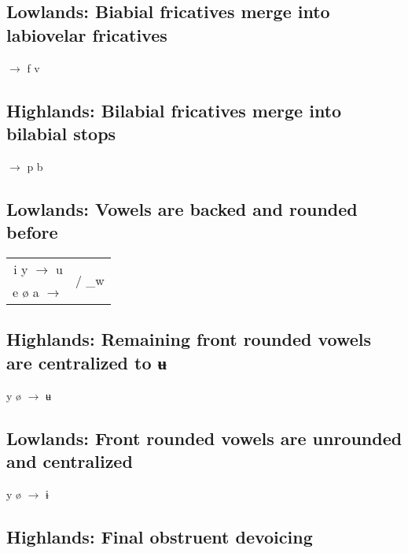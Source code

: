 \subsection{{\sc Lowlands:} Biabial fricatives merge into labiovelar fricatives}

\begin{center}
    \bilaf{} \bilav{} $\to$ f v
\end{center}

\subsection{{\sc Highlands:} Bilabial fricatives merge into bilabial stops}

\begin{center}
    \bilaf{} \bilav{} $\to$ p b
\end{center}

\subsection{{\sc Lowlands:} Vowels are backed and rounded before }

\begin{center}
    \begin{tabular}{rl}
    i y $\to$ u &
    \multirow{2}{*}{/ \_w}\\[0.1cm]
    e ø a $\to$ \opno{}
    \end{tabular}
\end{center}

\subsection{{\sc Highlands:} Remaining front rounded vowels are centralized to ʉ}

\begin{center}
    y ø $\to$ ʉ
\end{center}

\subsection{{\sc Lowlands:} Front rounded vowels are unrounded and centralized}

\begin{center}
    y ø $\to$ ɨ \schwa{}
\end{center}

\subsection{{\sc Highlands:} Final obstruent devoicing}
